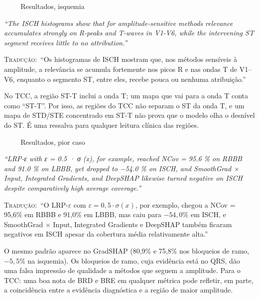 \documentclass[11pt,a4paper]{article}
\newcommand{\pagechip}[1]{{\setlength{\fboxsep}{1.5pt}\colorbox{cAcc}{\textcolor{white}{\scriptsize\texttt{#1}}}}}
\newenvironment{origquote}{\par\itshape\small}{\par}
\newenvironment{tradquote}{\par\small\textsc{Tradução:}\ }{\par}
\newcommand{\explab}[1]{\par\smallskip{\small\color{cAcc}\textbf{\MakeUppercase{#1}}}\par}
\begin{document}
\begin{citacard}{\pagechip{p. 4} Resultados, isquemia}
\begin{origquote}“The ISCH histograms show that for amplitude-sensitive methods relevance accumulates strongly on R-peaks and T-waves in V1-V6, while the intervening ST segment receives little to no attribution.”\end{origquote}
\begin{tradquote}“Os histogramas de ISCH mostram que, nos métodos sensíveis à amplitude, a relevância se acumula fortemente nos picos R e nas ondas T de V1--V6, enquanto o segmento ST, entre eles, recebe pouca ou nenhuma atribuição.”\end{tradquote}
\explab{Explicação}
No TCC, a região ST-T inclui a onda T; um mapa que vai para a onda T conta como “ST-T”. Por isso, as regiões do TCC não separam o ST da onda T, e um mapa de STD/STE concentrado em ST-T não prova que o modelo olha o desnível do ST. É uma ressalva para qualquer leitura clínica das regiões.
\end{citacard}

\begin{citacard}{\pagechip{p. 6} Resultados, pior caso}
\begin{origquote}“LRP-ε with ε = 0.5 · σ (x), for example, reached NCov = 95.6 \% on RBBB and 91.0 \% on LBBB, yet dropped to −54.0 \% on ISCH, and SmoothGrad × Input, Integrated Gradients, and DeepSHAP likewise turned negative on ISCH despite comparatively high average coverage.”\end{origquote}
\begin{tradquote}“O LRP-$\varepsilon$ com $\varepsilon = 0{,}5\cdot\sigma(x)$, por exemplo, chegou a NCov = 95,6\% em RBBB e 91,0\% em LBBB, mas caiu para $-54{,}0$\% em ISCH, e SmoothGrad $\times$ Input, Integrated Gradients e DeepSHAP também ficaram negativos em ISCH apesar da cobertura média relativamente alta.”\end{tradquote}
\explab{Explicação}
O mesmo padrão aparece no GradSHAP (80,9\% e 75,8\% nos bloqueios de ramo, $-5{,}5$\% na isquemia). Os bloqueios de ramo, cuja evidência está no QRS, dão uma falsa impressão de qualidade a métodos que seguem a amplitude. Para o TCC: uma boa nota de BRD e BRE em qualquer métrica pode refletir, em parte, a coincidência entre a evidência diagnóstica e a região de maior amplitude.
\end{citacard}
\end{document}
